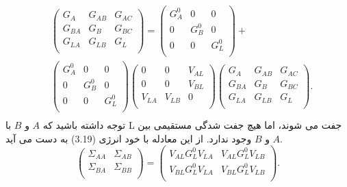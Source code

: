 \begin{equation}
    \begin{aligned}
          & \left( \begin{matrix}
           {{G}_{A}} & {{G}_{AB}} & {{G}_{AC}}  \\
           {{G}_{BA}} & {{G}_{B}} & {{G}_{BC}}  \\
           {{G}_{LA}} & {{G}_{LB}} & {{G}_{L}}  \\
        \end{matrix} \right)=\left( \begin{matrix}
           G_{A}^{0} & 0 & 0  \\
           0 & G_{B}^{0} & 0  \\
           0 & 0 & G_{L}^{0}  \\
        \end{matrix} \right)+ \\ 
         & \left( \begin{matrix}
           G_{A}^{0} & 0 & 0  \\
           0 & G_{B}^{0} & 0  \\
           0 & 0 & G_{L}^{0}  \\
        \end{matrix} \right)\left( \begin{matrix}
           0 & 0 & {{V}_{AL}}  \\
           0 & 0 & {{V}_{BL}}  \\
           {{V}_{LA}} & {{V}_{LB}} & 0  \\
        \end{matrix} \right)\left( \begin{matrix}
           {{G}_{A}} & {{G}_{AB}} & {{G}_{AC}}  \\
           {{G}_{BA}} & {{G}_{B}} & {{G}_{BC}}  \\
           {{G}_{LA}} & {{G}_{LB}} & {{G}_{L}}  \\
        \end{matrix} \right). \\ 
    \end{aligned}
\end{equation}
توجه داشته باشید که $A$ و $B$ با L جفت می شوند، اما هیچ جفت شدگی مستقیمی بین $A$ و $B$ وجود ندارد. از این معادله با خود انرژی (3.19) به دست می آید.
\begin{equation}
    \left( \begin{matrix}
           {{\Sigma }_{AA}} & {{\Sigma }_{AB}}  \\
           {{\Sigma }_{BA}} & {{\Sigma }_{BB}}  \\
        \end{matrix} \right)=\left( \begin{matrix}
           {{V}_{AL}}G_{L}^{0}{{V}_{LA}} & {{V}_{AL}}G_{L}^{0}{{V}_{LB}}  \\
           {{V}_{BL}}G_{L}^{0}{{V}_{LA}} & {{V}_{BL}}G_{L}^{0}{{V}_{LB}}  \\
        \end{matrix} 
    \right).
\end{equation}
